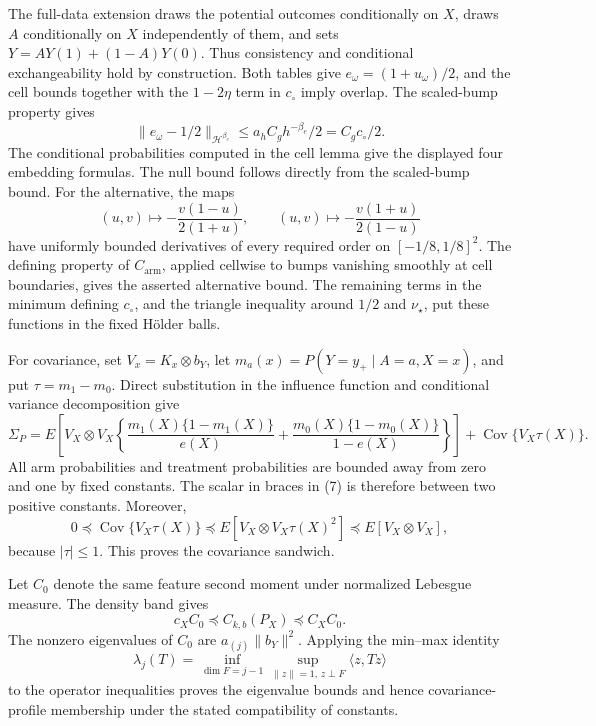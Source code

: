 The full-data extension draws the potential outcomes conditionally on \(X\), draws \(A\) conditionally on \(X\) independently of them, and sets \(Y=AY(1)+(1-A)Y(0)\). Thus consistency and conditional exchangeability hold by construction. Both tables give \(e_\omega=(1+u_\omega)/2\), and the cell bounds together with the \(1-2\eta\) term in \(c_\circ\) imply overlap. The scaled-bump property gives
\[
\|e_\omega-1/2\|_{\mathcal H^{\beta_e}}
\le a_hC_gh^{-\beta_e}/2=C_gc_\circ/2.
\]
The conditional probabilities computed in the cell lemma give the displayed four embedding formulas. The null bound follows directly from the scaled-bump bound. For the alternative, the maps
\[
(u,v)\mapsto-\frac{v(1-u)}{2(1+u)},\qquad
(u,v)\mapsto-\frac{v(1+u)}{2(1-u)}
\]
have uniformly bounded derivatives of every required order on \([-1/8,1/8]^2\). The defining property of \(C_{\mathrm{arm}}\), applied cellwise to bumps vanishing smoothly at cell boundaries, gives the asserted alternative bound. The remaining terms in the minimum defining \(c_\circ\), and the triangle inequality around \(1/2\) and \(\nu_\star\), put these functions in the fixed Hölder balls.

For covariance, set \(V_x=K_x\otimes b_Y\), let \(m_a(x)=P(Y=y_+\mid A=a,X=x)\), and put \(\tau=m_1-m_0\). Direct substitution in the influence function and conditional variance decomposition give
\[
\Sigma_P
=E\left[V_X\otimes V_X\left\{
\frac{m_1(X)\{1-m_1(X)\}}{e(X)}
+\frac{m_0(X)\{1-m_0(X)\}}{1-e(X)}\right\}\right]
+\operatorname{Cov}\{V_X\tau(X)\}. \tag{7}
\]
All arm probabilities and treatment probabilities are bounded away from zero and one by fixed constants. The scalar in braces in (7) is therefore between two positive constants. Moreover,
\[
0\preceq\operatorname{Cov}\{V_X\tau(X)\}
\preceq E[V_X\otimes V_X\tau(X)^2]
\preceq E[V_X\otimes V_X],
\]
because \(|\tau|\le1\). This proves the covariance sandwich.

Let \(C_0\) denote the same feature second moment under normalized Lebesgue measure. The density band gives
\[
c_XC_0\preceq C_{k,b}(P_X)\preceq C_XC_0.
\]
The nonzero eigenvalues of \(C_0\) are \(a_{(j)}\|b_Y\|^2\). Applying the min--max identity
\[
\lambda_j(T)=\inf_{\dim F=j-1}\sup_{\|z\|=1,\,z\perp F}\langle z,Tz\rangle
\]
to the operator inequalities proves the eigenvalue bounds and hence covariance-profile membership under the stated compatibility of constants.

